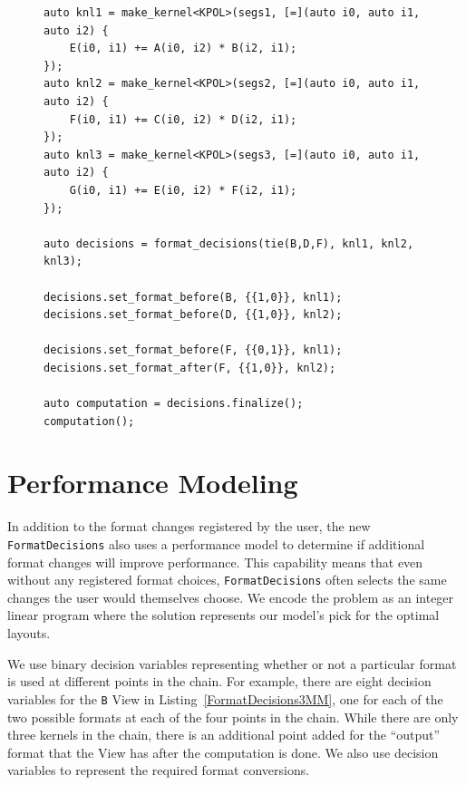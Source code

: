 \documentclass[sigconf, table]{acmart}
\begin{document}
\begin{figure}
\begin{lstlisting}[caption={The 3MM benchmark implemented using FormatDecisions.},
	label={FormatDecisions3MM}]
auto knl1 = make_kernel<KPOL>(segs1, [=](auto i0, auto i1, auto i2) {
	E(i0, i1) += A(i0, i2) * B(i2, i1);
});
auto knl2 = make_kernel<KPOL>(segs2, [=](auto i0, auto i1, auto i2) {
	F(i0, i1) += C(i0, i2) * D(i2, i1);
});
auto knl3 = make_kernel<KPOL>(segs3, [=](auto i0, auto i1, auto i2) {
	G(i0, i1) += E(i0, i2) * F(i2, i1);
});

auto decisions = format_decisions(tie(B,D,F), knl1, knl2, knl3);

decisions.set_format_before(B, {{1,0}}, knl1);
decisions.set_format_before(D, {{1,0}}, knl2);

decisions.set_format_before(F, {{0,1}}, knl1);
decisions.set_format_after(F, {{1,0}}, knl2);

auto computation = decisions.finalize();
computation();
\end{lstlisting}
\end{figure}

\section{Performance Modeling}

In addition to the format changes registered by the user, the new \verb.FormatDecisions. also uses a performance model to determine if additional format changes will improve performance. 
This capability means that even without any registered format choices, \verb.FormatDecisions. often selects the same changes the user would themselves choose. 
We encode the problem as an integer linear program where the solution represents our model's pick for the optimal layouts.


We use binary decision variables representing whether or not a particular format is used at different points in the chain. 
For example, there are eight decision variables for the \verb.B. View in Listing~\ref{FormatDecisions3MM}, one for each of the two possible formats at each of the four points in the chain. 
While there are only three kernels in the chain, there is an additional point added for the \enquote{output} format that the View has after the computation is done. 
We also use decision variables to represent the required format conversions.
\end{document}
